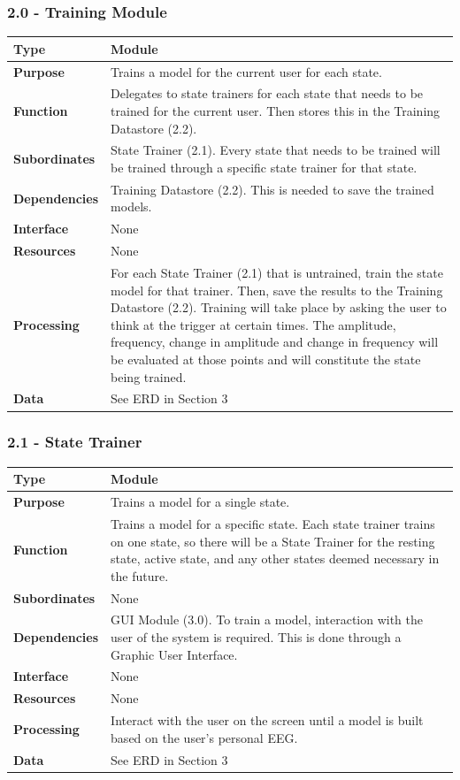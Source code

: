 \documentclass{article}
\begin{document}
\subsubsection*{2.0 - Training Module}
\begin{tabular}{ | l |  p{13.3cm} |}
\hline
\textbf{Type} & Module \\ \hline
\textbf{Purpose} & Trains a model for the current user for each state. \\ \hline
\textbf{Function} & Delegates to state trainers for each state that needs to be trained for the current user. Then stores this in the Training Datastore (2.2). \\ \hline
\textbf{Subordinates} & State Trainer (2.1). Every state that needs to be trained will be trained through a specific state trainer for that state. \\ \hline
\textbf{Dependencies} & Training Datastore (2.2). This is needed to save the trained models. \\ \hline
\textbf{Interface} & None \\ \hline
\textbf{Resources} & None \\ \hline
\textbf{Processing} & For each State Trainer (2.1) that is untrained, train the state model for that trainer. Then, save the results to the Training Datastore (2.2). Training will take place by asking the user to think at the trigger at certain times. The amplitude, frequency, change in amplitude and change in frequency will be evaluated at those points and will constitute the state being trained. \\ \hline
\textbf{Data} & See ERD in Section 3 \\ \hline
\end{tabular}

\subsubsection*{2.1 - State Trainer}
\begin{tabular}{ | l |  p{13.3cm} |}
\hline
\textbf{Type} & Module \\ \hline
\textbf{Purpose} & Trains a model for a single state. \\ \hline
\textbf{Function} & Trains a model for a specific state. Each state trainer trains on one state, so there will be a State Trainer for the resting state, active state, and any other states deemed necessary in the future. \\ \hline
\textbf{Subordinates} & None \\ \hline
\textbf{Dependencies} & GUI Module (3.0). To train a model, interaction with the user of the system is required. This is done through a Graphic User Interface.  \\ \hline
\textbf{Interface} & None \\ \hline
\textbf{Resources} & None \\ \hline
\textbf{Processing} & Interact with the user on the screen until a model is built based on the user's personal EEG. \\ \hline
\textbf{Data} & See ERD in Section 3 \\ \hline
\end{tabular}
\end{document}

